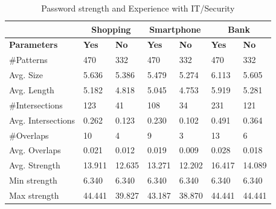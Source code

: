       \begin{table}[H]
        \centering
        \begin{tabular}{l || l | l || l | l || l | l }
          \hline
           & \multicolumn{2}{c||}{\bf Shopping} & \multicolumn{2}{c||}{\bf Smartphone} &\multicolumn{2}{c}{\bf Bank} \\ \hline
          {\bf Parameters}   & {\bf Yes} & {\bf No} & {\bf Yes} & {\bf No} & {\bf Yes} & {\bf No}\\ \hline
          \#Patterns         & 470    & 332    & 470    & 332    & 470    & 332    \\
          Avg. Size          & 5.636  & 5.386  & 5.479  & 5.274  & 6.113  & 5.605  \\
          Avg. Length        & 5.182  & 4.818  & 5.045  & 4.753  & 5.919  & 5.281  \\
          \#Intersections    & 123    & 41     & 108    & 34     & 231    & 121    \\
          Avg. Intersections & 0.262  & 0.123  & 0.230  & 0.102  & 0.491  & 0.364  \\
          \#Overlaps         & 10     & 4      & 9      & 3      & 13     & 6      \\
          Avg. Overlaps      & 0.021  & 0.012  & 0.019  & 0.009  & 0.028  & 0.018  \\ \hline
          Avg. Strength      & 13.911 & 12.635 & 13.271 & 12.202 & 16.417 & 14.089 \\ 
          Min strength       & 6.340  & 6.340  & 6.340  & 6.340  & 6.340  & 6.340  \\
          Max strength       & 44.441 & 39.827 & 43.187 & 38.870 & 44.441 & 44.441 \\ \hline
        \end{tabular}
        \caption{Password strength and Experience with IT/Security}
        \label{tab:experiencestrength} 
      \end{table}

